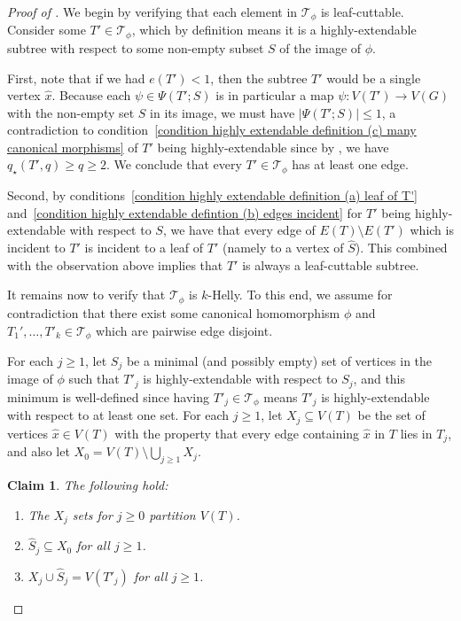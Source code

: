 \documentclass[12pt,letterpaper]{article}
\newtheorem{claim}[theorem]{Claim}
\theoremstyle{definition}
\newcommand{\pow}{q} %
\newcommand{\Pow}{{q_\star}} %
\renewcommand{\c}[1]{\mathcal{#1}}
\newcommand{\sm}{\setminus}
\newcommand{\sub}{\subseteq}
\begin{document}
	\begin{proof}[Proof of ]
		We begin by verifying that each element in $\c{T}_\phi$ is leaf-cuttable.  Consider some $T'\in \c{T}_\phi$, which by definition means it is a highly-extendable subtree with respect to some non-empty subset $S$ of the image of $\phi$.  
		
		First, note that if we had $e(T')<1$, then the subtree $T'$ would be a single vertex $\hat{x}$.  Because each $\psi \in \Psi(T';S)$ is in particular a map $\psi:V(T')\to V(G)$ with the non-empty set $S$ in its image, we must have $|\Psi(T';S)|\le 1$, a contradiction to condition~\ref{condition highly extendable definition (c) many canonical morphisms} of $T'$ being highly-extendable since by , we have $\Pow(T',q) \ge \pow\ge 2$.  We conclude that every $T'\in \c{T}_\phi$ has at least one edge.
		
		Second, by conditions~\ref{condition highly extendable definition (a) leaf of T'} and~\ref{condition highly extendable defintion (b) edges incident} for $T'$ being highly-extendable with respect to $S$, we have that every edge of $E(T)\sm E(T')$ which is incident to $T'$ is incident to a leaf of $T'$ (namely to a vertex of $\widehat{S}$).  This combined with the observation above implies that $T'$ is always a leaf-cuttable subtree. 
		
		It remains now to verify that $\c{T}_\phi$ is $k$-Helly.  To this end, we assume for contradiction that there exist some canonical homomorphism $\phi$ and $T_1',\ldots,T'_k\in \c{T}_\phi$ which are pairwise edge disjoint.  
		
		For each $j\ge 1$, let $S_j$ be a minimal (and possibly empty) set of vertices in the image of $\phi$ such that $T'_j$ is highly-extendable with respect to $S_j$, and this minimum is well-defined since having $T'_j\in \c{T}_\phi$ means $T'_j$ is highly-extendable with respect to at least one set.  For each $j\ge 1$, let $X_j\sub V(T)$ be the set of vertices $\hat{x}\in V(T)$ with the property that every edge containing $\hat{x}$ in $T$ lies in $T_j$, and also let $X_0=V(T)\sm \bigcup_{j\ge 1} X_j$.
		\begin{claim}\label{cl:XFacts}
			The following hold:
			\begin{enumerate}[label=(\roman*')]
				\item The $X_j$ sets for $j\ge 0$ partition $V(T)$.\label{cl:XFacts (i') partition}
				\item $\widehat{S}_j\sub X_0$ for all $j\ge 1$.\label{cl:XFacts (ii') hat S_j is in X_0}
				\item $X_j\cup \widehat{S}_j=V(T'_j)$ for all $j\ge 1$.\label{cl:XFacts (iii') X_j cup hat S_j is T'_j}
			\end{enumerate}
		\end{claim}
		

\end{proof}
\end{document}
